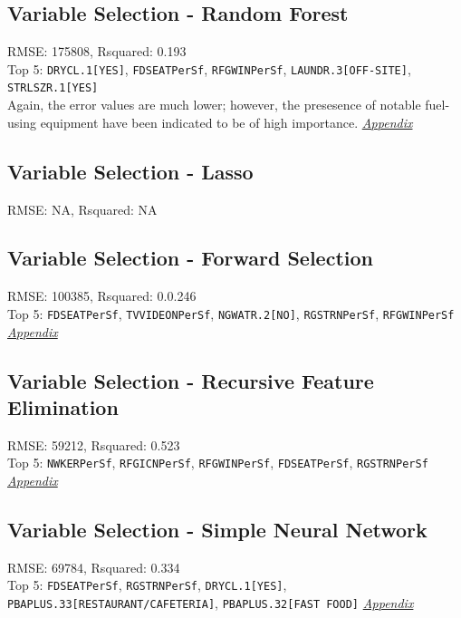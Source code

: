 \subsection{Variable Selection - Random Forest}
RMSE: 175808, Rsquared: 0.193\\
Top 5: \lstinline{DRYCL.1[YES]}, \lstinline{FDSEATPerSf}, \lstinline{RFGWINPerSf}, \lstinline{LAUNDR.3[OFF-SITE]}, \lstinline{STRLSZR.1[YES]} 
\\[0.1in]
Again, the error values are much lower; however, the presesence of notable fuel-using equipment have been indicated to be of high importance. \textit{\hyperref[appendix:natural_gas:rf]{Appendix}}

\subsection{Variable Selection - Lasso}
RMSE: NA, Rsquared: NA\\

\subsection{Variable Selection - Forward Selection}
RMSE: 100385, Rsquared: 0.0.246\\
Top 5: \lstinline{FDSEATPerSf}, \lstinline{TVVIDEONPerSf}, \lstinline{NGWATR.2[NO]}, \lstinline{RGSTRNPerSf}, \lstinline{RFGWINPerSf}  \textit{\hyperref[appendix:natural_gas:lp]{Appendix}}

\subsection{Variable Selection - Recursive Feature Elimination}
RMSE: 59212, Rsquared: 0.523\\
Top 5: \lstinline{NWKERPerSf}, \lstinline{RFGICNPerSf}, \lstinline{RFGWINPerSf}, \lstinline{FDSEATPerSf}, \lstinline{RGSTRNPerSf}  \textit{\hyperref[appendix:natural_gas:rfe]{Appendix}}

\subsection{Variable Selection - Simple Neural Network}
RMSE: 69784, Rsquared: 0.334\\
Top 5: \lstinline{FDSEATPerSf}, \lstinline{RGSTRNPerSf}, \lstinline{DRYCL.1[YES]}, \lstinline{PBAPLUS.33[RESTAURANT/CAFETERIA]}, \lstinline{PBAPLUS.32[FAST FOOD]}  
\textit{\hyperref[appendix:natural_gas:snn]{Appendix}}
\newpage
